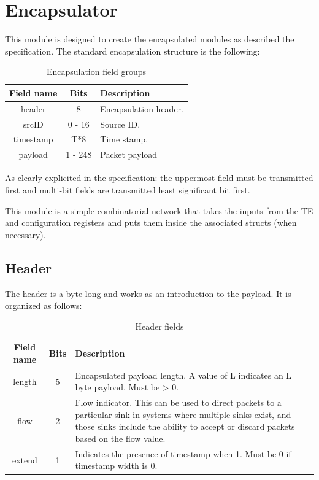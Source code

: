\chapter{Encapsulator}\label{encapsulator}

This module is designed to create the encapsulated modules as described the specification.
The standard encapsulation structure is the following:
\begin{table}[H]
    \centering 
    \begin{tabularx}{\textwidth}{|c|c|>{\centering\arraybackslash}X|} 
        \hline
        Field name  & Bits      & Description \\ \hline
        header      & 8         & Encapsulation header. \\ \hline
        srcID       & 0 - 16    & Source ID. \\ \hline
        timestamp   & T*8       & Time stamp.\\ \hline
        payload     & 1 - 248   & Packet payload \\ \hline    
    \end{tabularx}
    \caption{Encapsulation field groups} 
    \label{tab:encapsulation_groups}
\end{table}

As clearly explicited in the specification: the uppermost field must be transmitted first and 
multi-bit fields are transmitted least significant bit first.

This module is a simple combinatorial network that takes the inputs from the TE and configuration 
registers and puts them inside the associated structs (when necessary).

\section{Header}
The header is a byte long and works as an introduction to the payload.
It is organized as follows:
\begin{table}[H]
    \centering 
    \begin{tabularx}{\textwidth}{|c|c|>{\centering\arraybackslash}X|} 
        \hline
        Field name  & Bits  & Description \\ \hline
        length      & 5     & Encapsulated payload length. A value of L indicates an L byte 
                              payload. Must be > 0.  \\ \hline
        flow        & 2     & Flow indicator. This can be used to direct packets to a particular 
                              sink in systems where multiple sinks exist, and those sinks include 
                              the ability to accept or discard packets based on the flow value. \\ \hline
        extend      & 1     & Indicates the presence of timestamp when 1. Must be 0 if timestamp 
                              width is 0. \\ \hline
    \end{tabularx}
    \caption{Header fields} 
    \label{tab:header}
\end{table}

